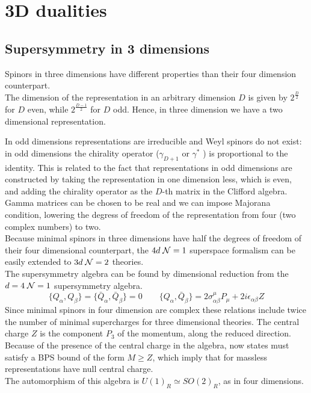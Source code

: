 

\section{3D dualities}
\subsection{Supersymmetry in 3 dimensions}
Spinors in three dimensions have different properties than their four dimension counterpart.\\
The dimension of the representation in an arbitrary dimension $D$  is given by $2^{\frac{D}{2}} $
for $D$ even, while $2^{\frac{D-1}{2}} $ for $D$ odd.
Hence, in three dimension we have a two dimensional representation.

In odd dimensions representations are irreducible and Weyl spinors do not exist: in odd dimensions the chirality operator ($\gamma_{D+1}$ or $\gamma^*$ ) is proportional to the identity.
This is related to the fact that representations in odd dimensions are constructed by taking the representation in one dimension less, which is even, and adding the chirality operator as the $D$-th matrix in the Clifford algebra.\\
Gamma matrices can be chosen to be real and we can impose Majorana condition, lowering the degress of freedom of the representation from four (two complex numbers) to two.\\
Because minimal spinors in three dimensions have half the degrees of freedom of their four dimensional counterpart, the $4d \; \mathcal{N}=1$ superspace formalism can be easily extended to $3d \; \mathcal{N}=2$ theories.
\\
The supersymmetry algebra can be found by dimensional reduction from  the $d=4 \; \mathcal{N}=1$ supersymmetry algebra. 
\begin{equation}
 \{ Q_{\alpha},Q_{\beta} \} =  \{ \bar{Q}_{\alpha},\bar{Q}_{\beta} \}= 0 \qquad \{ Q_{\alpha} , \bar{Q}_{\beta}   \} = 2 \sigma^{\mu}_{\alpha \beta} P_{\mu} + 2 i \epsilon_{\alpha \beta} Z
 \end{equation} 
Since minimal spinors in four dimension are complex these relations include twice the number of minimal supercharges for three dimensional theories.
The central charge $Z$ is the component $P_3$ of the momentum, along the reduced direction.
Because of the presence of the central charge in the algebra, now states must satisfy a BPS bound of the form $M \geq Z $, which imply that for massless representations have null central charge.
\\
The automorphism of this algebra is $U(1)_R \simeq SO(2)_R$, as in four dimensions.

